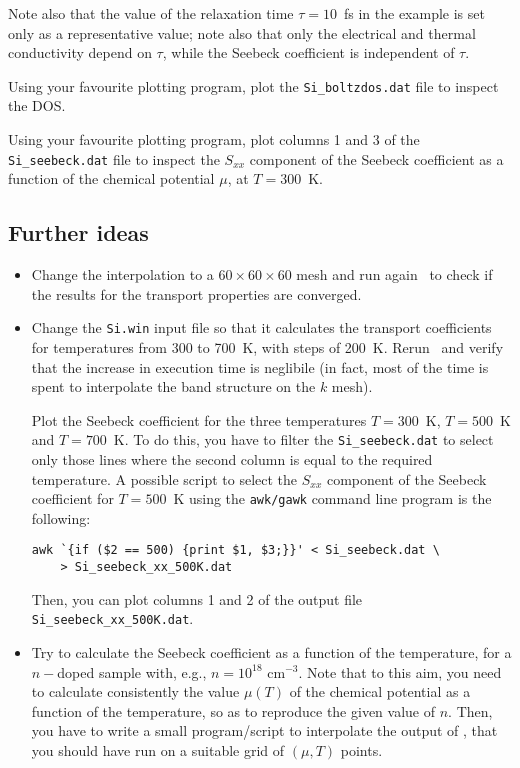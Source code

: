 \documentclass[a4paper,11pt,twoside]{article}
\begin{document}
Note also that the value of the relaxation time $\tau=10$~fs in the
example is set only as a representative
value; note also that only the electrical and thermal conductivity
depend on $\tau$, while the Seebeck coefficient is independent of
$\tau$.

Using your favourite plotting program, plot the {\tt Si\_boltzdos.dat} file to inspect the DOS.

Using your favourite plotting program, plot columns 1 and 3 of the {\tt Si\_seebeck.dat} file to inspect the $S_{xx}$ component of the Seebeck coefficient as a function of the chemical potential $\mu$, at $T=300$~K.

\subsection*{Further ideas}

\begin{itemize}
\item Change the interpolation to a $60\times 60\times 60$ mesh and run again \postw\ to check if the results for the transport properties are converged. 

\item Change the {\tt Si.win} input file so that it calculates the transport coefficients for temperatures from 300 to 700~K, with steps of 200~K. Rerun \postw\ and verify that the increase in execution time is neglibile (in fact, most of the time is spent to interpolate the band structure on the $k$ mesh).

Plot the Seebeck coefficient for the three temperatures $T=300$~K, $T=500$~K and $T=700$~K. To do this, you have to filter the {\tt Si\_seebeck.dat} to select only those lines where the second column is equal to the required temperature. A possible script to select the $S_{xx}$ component of the Seebeck coefficient for $T=500$~K using the {\tt awk/gawk} command line program is the following:
\begin{verbatim}
awk `{if ($2 == 500) {print $1, $3;}}' < Si_seebeck.dat \
    > Si_seebeck_xx_500K.dat
\end{verbatim}
Then, you can plot columns 1 and 2 of the output file \verb#Si_seebeck_xx_500K.dat#.
\item Try to calculate the Seebeck coefficient as a function of the temperature, for a $n-$doped sample with, e.g., $n=10^{18}$ cm$^{-3}$. Note that to this aim, you need to calculate consistently the value $\mu(T)$ of the chemical potential as a function of the temperature, so as to reproduce the given value of $n$. Then, you have to write a small program/script to interpolate the output of \bw, that you should have run on a suitable grid of $(\mu,T)$ points.
\end{itemize}
\end{document}
